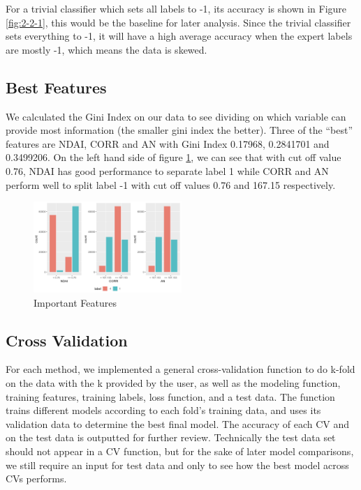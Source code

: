 \documentclass[11pt]{article}
\begin{document}
For a trivial classifier which sets all labels to -1, its accuracy is shown in Figure \ref{fig:2-2-1}, this would be the baseline for later analysis. Since the trivial classifier sets everything to -1, it will have a high average accuracy when the expert labels are mostly -1, which means the data is skewed.

\subsection{Best Features}

We calculated the Gini Index on our data to see dividing on which variable can provide most information (the smaller gini index the better). Three of the ``best'' features are NDAI, CORR and AN with Gini Index 0.17968, 0.2841701 and 0.3499206. On the left hand side of figure \ref{fig:2-3-1}, we can see that with cut off value 0.76, NDAI has good performance to separate label 1 while CORR and AN perform well to split label -1 with cut off values 0.76 and 167.15 respectively. 


\begin{figure}[h]
\includegraphics[width=0.5\textwidth]{2-3-1.jpeg}
\centering
\caption{Important Features}
\label{fig:2-3-1}
\centering
\end{figure}



\subsection{Cross Validation}

For each method, we implemented a general cross-validation function to do k-fold on the data with the k provided by the user, as well as the modeling function, training features, training labels, loss function, and a test data. The function trains different models according to each fold's training data, and uses its validation data to determine the best final model. The accuracy of each CV and on the test data is outputted for further review. Technically the test data set should not appear in a CV function, but for the sake of later model comparisons, we still require an input for test data and only to see how the best model across CVs performs. 
\end{document}

